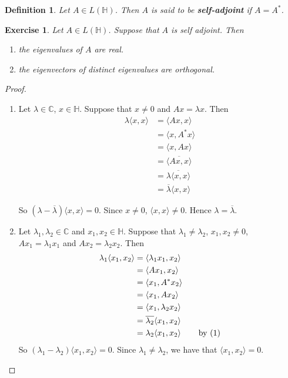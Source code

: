 \documentclass[12pt]{amsart}
\newtheorem{defn}[thm]{Definition}
\newtheorem{ex}[thm]{Exercise}
\renewcommand{\r}{\rangle}
\renewcommand{\l}{\langle}
\newcommand{\lam}{\lambda}
\newcommand{\C}{\mathbb{C}}
\renewcommand{\H}{\mathbb{H}}
\begin{document}
\begin{defn}
Let $A \in  L(\H)$. Then $A$ is said to be \textbf{self-adjoint} if $A = A^*$.
\end{defn}

\begin{ex}
Let $A \in L(\H)$. Suppose that $A$ is self adjoint. Then 
\begin{enumerate}
\item the eigenvalues of $A$ are real.
\item the eigenvectors of distinct eigenvalues are orthogonal.
\end{enumerate} 
\end{ex}

\newpage
\begin{proof}\
\begin{enumerate}
\item Let $\lam \in \C$, $x \in \H$. Suppose that $x \neq 0$ and $Ax = \lam x$. Then 
\begin{align*}
\lam \l x, x\r
&= \l Ax,x \r\\
&= \l x, A^*x \r\\
&= \l x, Ax \r\\
&= \overline{\l Ax, x \r}\\
&= \overline{\lam \l x, x\r}\\
&= \overline{\lam} \l x,x \r
\end{align*}

So $(\lam - \overline{\lam}) \l x,x \r =0$. Since $x \neq 0$, $\l x,x\r \neq 0$. Hence $\lam = \overline{\lam}$. \vspace{5mm}
\item Let $\lam_1, \lam_2 \in \C$ and $x_1,x_2 \in \H$. Suppose that $\lam_1 \neq \lam_2$, $x_1,x_2 \neq 0$, \\$Ax_1 = \lam_1 x_1$ and $Ax_2 = \lam_2 x_2$. 
Then 
\begin{align*}
\lam_1 \l x_1, x_2\r
&= \l \lam_1 x_1, x_2 \r \\
&= \l A x_1, x_2 \r \\
&= \l  x_1, A^* x_2 \r \\
&= \l  x_1, A x_2 \r \\
&= \l  x_1, \lam_2 x_2 \r \\
&= \overline{\lam_2} \l  x_1, x_2 \r \\
&= \lam_2 \l  x_1, x_2 \r \hspace{.75cm} \text{by (1)}\\
\end{align*}
So $(\lam_1 - \lam_2)\l x_1, x_2\r = 0$. Since $\lam_1 \neq \lam_2$, we have that $\l x_1, x_2\r = 0$.
\end{enumerate}
\end{proof}
\end{document}
